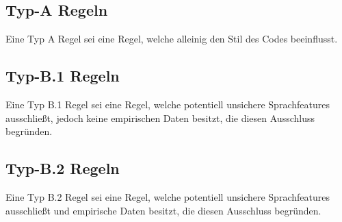\documentclass[a4paper,UKenglish,cleveref, autoref]{templates/lipics-v2019}
\begin{document}
    \subsection{Typ-A Regeln}
    \label{subsec:typ-a-regeln}
    \begin{definition}
        Eine Typ A Regel sei eine Regel, welche alleinig den Stil des Codes beeinflusst.
    \end{definition}

    \begin{minipage}{\linewidth}
        \begin{example}
            
        \end{example}
    \end{minipage}

    \subsection{Typ-B.1 Regeln}
    \label{subsec:typ-b-1-regeln}
    \begin{definition}
        Eine Typ B.1 Regel sei eine Regel, welche potentiell unsichere Sprachfeatures ausschließt,
        jedoch keine empirischen Daten besitzt, die diesen Ausschluss begründen.
    \end{definition}

    \begin{minipage}{\linewidth}
        \begin{example}
            
        \end{example}
    \end{minipage}
    
    \subsection{Typ-B.2 Regeln}
    \label{subsec:typ-b-2-regeln}
    \begin{definition}
        Eine Typ B.2 Regel sei eine Regel, welche potentiell unsichere Sprachfeatures ausschließt und empirische
        Daten besitzt, die diesen Ausschluss begründen.
    \end{definition}

    \begin{minipage}{\linewidth}
        \begin{example}
            
        \end{example}
    \end{minipage}
    
\end{document}
